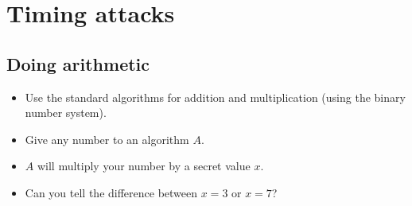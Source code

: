 \section{Timing attacks}

\subsection{Doing arithmetic}

\begin{frame}
  \begin{example}
    \begin{itemize}
      \item Use the standard algorithms for addition and multiplication (using 
        the binary number system).
      \item Give any number to an algorithm \(A\).
      \item \(A\) will multiply your number by a secret value \(x\).
      \item Can you tell the difference between \(x = 3\) or \(x = 7\)?
    \end{itemize}
  \end{example}
\end{frame}

